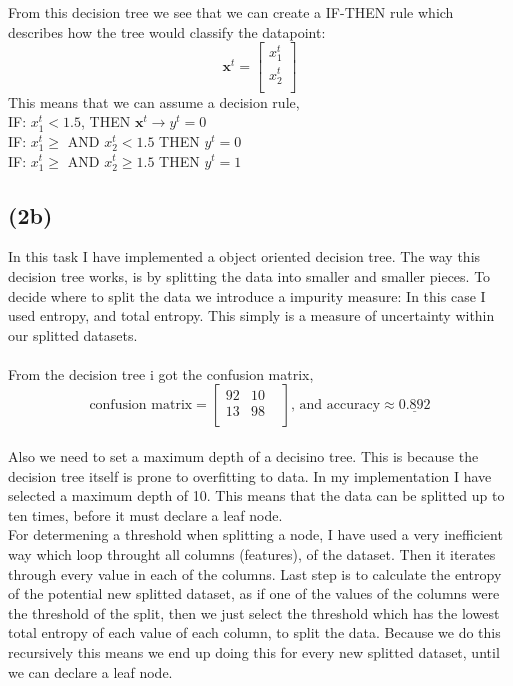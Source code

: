 \documentclass[12pt, letterpaper]{article}
\newcommand{\mbf}{\mathbf}
\begin{document}
      \noindent From this decision tree we see that we can create a IF-THEN rule which describes how the tree would classify the datapoint:
      \[
        \mbf{x}^t =
        \left[
          \begin{array}{ccc}
            x_1^t \\
            x_2^t \\
          \end{array}
        \right]
      \]
      This means that we can assume a decision rule,\\
      IF: $x_1^t < 1.5$, THEN $\mbf{x}^t \rightarrow y^t = 0$\\
      IF: $x_1^t \geq$ AND $x_2^t < 1.5$ THEN $y^t = 0$\\
      IF: $x_1^t \geq$ AND $x_2^t \geq 1.5$ THEN $y^t = 1$\\
    \subsection*{(2b)}
      In this task I have implemented a object oriented decision tree. The way this decision tree works, is by splitting the data into smaller and smaller pieces. To decide where to split the data we introduce a impurity measure: In this case I used entropy, and total entropy. This simply is a measure of uncertainty within our splitted datasets.\\ \\
      From the decision tree i got the confusion matrix,
      \[
        \text{confusion matrix} =
        \begin{bmatrix}
          92 & 10  & \\
          13 & 98 & \\
        \end{bmatrix}
        \text{, and accuracy} \approx \underline{0.892}
      \]\\
      Also we need to set a maximum depth of a decisino tree. This is because the decision tree itself is prone to overfitting to data. In my implementation I have selected a maximum depth of 10. This means that the data can be splitted up to ten times, before it must declare a leaf node.\\
      For determening a threshold when splitting a node, I have used a very inefficient way which loop throught all columns (features), of the dataset. Then it iterates through every value in each of the columns. Last step is to calculate the entropy of the potential new splitted dataset, as if one of the values of the columns were the threshold of the split, then we just select the threshold which has the lowest total entropy of each value of each column, to split the data. Because we do this recursively this means we end up doing this for every new splitted dataset, until we can declare a leaf node.\\
\end{document}
